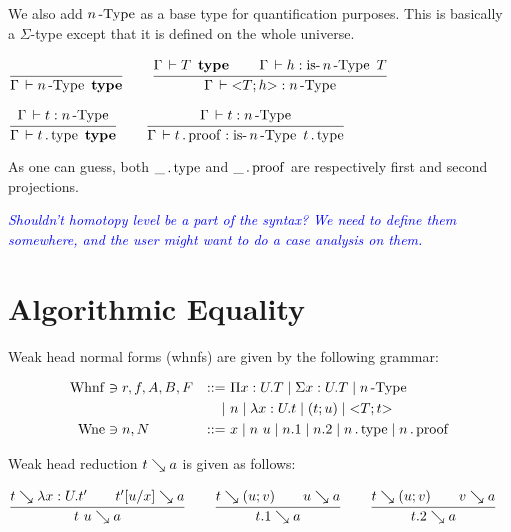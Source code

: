\documentclass[a4paper,english]{lipics-utf8x}
\newcommand\meta[1]{\noindent\textcolor{blue}{\emph{#1}}}
\begin{document}
  We also add $n\operatorname{-Type}$ as a base type for quantification
  purposes. This is basically a $\Sigma$-type except that it is
  defined on the whole universe.

  \begin{center}
  \(
    \ru{}{\Gamma \der \nType{n} \type}
    \qquad
    \ru{\Gamma \der T \type \qquad
        \Gamma \der h : \isnType{n}{T}
      }{\Gamma \der {<} T ; h {>} : \nType{n}}
  \)
  \end{center}

  \begin{center}
  \(
    \ru{\Gamma \der t : \nType{n}
      }{\Gamma \der t \gettype \type}
    \qquad
    \ru{\Gamma \der t : \nType{n}
      }{\Gamma \der t \getproof : \isnType{n}{t \gettype}}
  \)
  \end{center}

  As one can guess, both $\_ \operatorname{.type}$ and $\_ \operatorname{.proof}$ are respectively first
  and second projections.

  \meta{Shouldn't homotopy level be a part of the syntax? We need to define them
  somewhere, and the user might want to do a case analysis on them.}

  \section{Algorithmic Equality}


  Weak head normal forms (whnfs) are given by the following grammar:

  \begin{align*}
    \operatorname{Whnf} &\ni r,f,A,B,F &::=~&  \Pi x:U.T \mid \Sigma x:U.T \mid
                                 n\operatorname{-Type} \\
        &&\mid~& n \mid \lambda x:U.t \mid (t;u) \mid {<}T;t{>} \\
    \operatorname{Wne}  &\ni n,N &::=~& x \mid n~u \mid n.1 \mid n.2
               \mid n \operatorname{.type} \mid n \operatorname{.proof}
  \end{align*}

  Weak head reduction $t \searrow a$ is given as follows:

  \begin{center}
  \(
    \ru{t \rew \lambda x:U.t' \qquad
        t'[u/x] \rew a
      }{t~u \rew a}
    \qquad
    \ru{t \rew (u;v) \qquad
        u \rew a
      }{t.1 \rew a}
    \qquad
    \ru{t \rew (u;v) \qquad
        v \rew a
      }{t.2 \rew a}
  \)
  \end{center}
\end{document}
